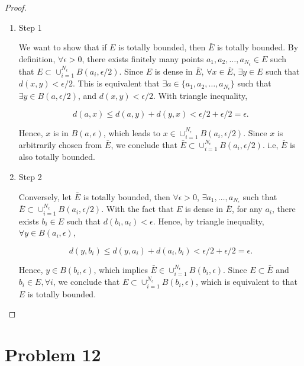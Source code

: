 \documentclass[12pt]{article}
\begin{document}
\begin{proof}

\begin{enumerate}
\item Step 1

We want to show that if $E$ is totally bounded, then $\bar E$ is totally bounded. By definition, $\forall \epsilon >0$, there exists finitely many points $a_1, a_2, \dots, a_{N_\epsilon} \in E$ such that $E \subset \cup_{i=1}^{N_\epsilon} B(a_i, \epsilon/2)$. Since $E$ is dense in $\bar E$, $\forall x \in \bar E$, $\exists y \in E$ such that $d(x, y)<\epsilon/2$. This is equivalent that $\exists a \in \{a_1, a_2, \dots, a_{N_\epsilon}\}$ such that $\exists y \in B(a, \epsilon/2)$, and $d(x, y) < \epsilon/2$. With triangle inequality, 

$$
d(a, x) \leqslant d(a, y) + d(y, x) < \epsilon/2 + \epsilon/2 = \epsilon.
$$

Hence, $x$ is in $B(a, \epsilon)$, which leads to $x \in \cup_{i=1}^{N_\epsilon} B(a_i, \epsilon/2)$. Since $x$ is arbitrarily chosen from $\bar E$, we conclude that $\bar E \subset \cup_{i=1}^{N_\epsilon} B(a_i, \epsilon/2)$. i.e, $\bar E$ is also totally bounded.

\item Step 2

Conversely, let $\bar E$ is totally bounded, then $\forall \epsilon > 0$, $\exists a_1, \dots, a_{N_\epsilon}$ such that $\bar E \subset \cup_{i=1}^{N_\epsilon} B(a_i, \epsilon/2)$. With the fact that $E$ is dense in $\bar E$, for any $a_i$, there exists $b_i \in E$ such that $d(b_i, a_i)<\epsilon$. Hence, by triangle inequality, $\forall y \in B(a_i, \epsilon)$, 

$$
d(y, b_i) \leqslant d(y, a_i) + d(a_i, b_i) < \epsilon/2 + \epsilon/2 = \epsilon.
$$

Hence, $y \in B(b_i, \epsilon)$, which implies $\bar E \in \cup_{i=1}^{N_\epsilon} B(b_i, \epsilon)$. Since $E\subset \bar E$ and $b_i \in E, \forall i$, we conclude that $E \subset \cup_{i=1}^{N_\epsilon} B(b_i, \epsilon)$, which is equivalent to that $E$ is totally bounded.


\end{enumerate}

\end{proof}

\section*{Problem 12}
\end{document}
